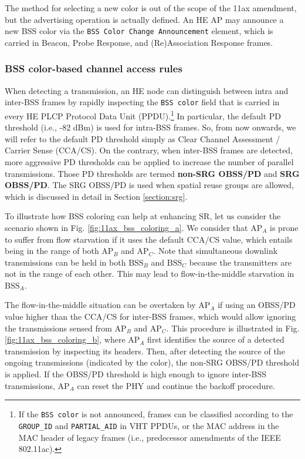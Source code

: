 \documentclass{ieeeaccess}
\begin{document}
The method for selecting a new color is out of the scope of the 11ax amendment, but the advertising operation is actually defined. An HE AP may announce a new BSS color via the \texttt{BSS Color Change Announcement} element, which is carried in Beacon, Probe Response, and (Re)Association Response frames. 

\subsubsection{BSS color-based channel access rules}
\label{section:bss_color_channel_access}
When detecting a transmission, an HE node can distinguish between intra and inter-BSS frames by rapidly inspecting the \texttt{BSS color} field that is carried in every HE PLCP Protocol Data Unit (PPDU).\footnote{If the \texttt{BSS color} is not announced, frames can be classified according to the \texttt{GROUP\_ID} and \texttt{PARTIAL\_AID} in VHT PPDUs, or the MAC address in the MAC header of legacy frames (i.e., predecessor amendments of the IEEE 802.11ac).} In particular, the default PD threshold (i.e., -82 dBm) is used for intra-BSS frames. So, from now onwards, we will refer to the default PD threshold simply as Clear Channel Assessment / Carrier Sense (CCA/CS). On the contrary, when inter-BSS frames are detected, more aggressive PD thresholds can be applied to increase the number of parallel transmissions. Those PD thresholds are termed \textbf{non-SRG OBSS/PD} and \textbf{SRG OBSS/PD}. The SRG OBSS/PD is used when spatial reuse groups are allowed, which is discussed in detail in Section \ref{section:srg}.

To illustrate how BSS coloring can help at enhancing SR, let us consider the scenario shown in Fig. \ref{fig:11ax_bss_coloring_a}. We consider that $\text{AP}_{A}$ is prone to suffer from flow starvation if it uses the default CCA/CS value, which entails being in the range of both $\text{AP}_B$ and $\text{AP}_C$. Note that simultaneous downlink transmissions can be held in both $\text{BSS}_B$ and $\text{BSS}_C$ because the transmitters are not in the range of each other. This may lead to flow-in-the-middle starvation in $\text{BSS}_A$. 

The flow-in-the-middle situation can be overtaken by $\text{AP}_{A}$ if using an OBSS/PD value higher than the CCA/CS for inter-BSS frames, which would allow ignoring the transmissions sensed from $\text{AP}_B$ and $\text{AP}_C$. This procedure is illustrated in Fig. \ref{fig:11ax_bss_coloring_b}, where $\text{AP}_A$ first identifies the source of a detected transmission by inspecting its headers. Then, after detecting the source of the ongoing transmissions (indicated by the color), the non-SRG OBSS/PD threshold is applied. If the OBSS/PD threshold is high enough to ignore inter-BSS transmissions, $\text{AP}_A$ can reset the PHY and continue the backoff procedure.
\end{document}
